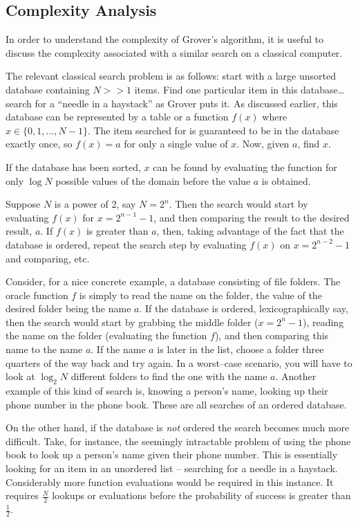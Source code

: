 \subsection{Complexity Analysis}

In order to understand the complexity of Grover's algorithm,
it is useful to discuss the complexity associated with a 
similar search on a classical computer.

The relevant classical search problem is as follows:  
start with a large unsorted database containing $N>>1$ items.
Find one particular item in this database\dots
search for a ``needle in a haystack'' as Grover puts
it\cite{Grover:96a}.  As discussed earlier, this database can 
be represented by a table or a function $f(x)$ where
$x\in\lbrace 0,1,\ldots,N-1\rbrace$.
The item searched for is guaranteed to be in the database
exactly once, so $f(x)=a$ for only a single 
value of $x$. Now, given $a$, find $x$.

If the database has been sorted, $x$ can be found by 
evaluating the function for only $\log N$ possible 
values of the domain before the value $a$ is obtained.

Suppose $N$ is a power of 2, say $N=2^n$.  Then the search
would start by evaluating $f(x)$ for $x=2^{n-1}-1$,
and then comparing the result to the desired result, $a$.
If $f(x)$ is greater than $a$, then, taking advantage of the
fact that the database is ordered, repeat the search
step by evaluating $f(x)$ on $x=2^{n-2}-1$ and comparing,
etc.  

Consider, for a nice concrete example, a database consisting
of file folders.  The oracle function $f$ is simply to read
the name on the folder, the value of the desired folder being
the name $a$.  If the database is ordered, lexicographically say,
then the search would start by grabbing the middle folder
($x=2^n-1$), reading the name on the folder (evaluating the
function $f$), and then comparing this name to the name $a$.
If the name $a$ is later in the list, choose a folder three
quarters of the way back and try again.  In a worst--case
scenario, you will have to look at $\log_2 N$ different 
folders to find the one with the name $a$.  
Another example of this kind of search
is, knowing a person's name, looking up their phone number in
the phone book.  These are all searches of an ordered database.

On the other hand, if the database is {\sl not} ordered the search
becomes much more difficult.  Take, for instance, the seemingly
intractable problem of using the phone book to look up a 
person's name given their phone number.  This is essentially
looking for an item in an unordered list -- searching for a 
needle in a haystack.  Considerably more function evaluations
would be required in this instance.  It requires $\frac{N}{2}$
lookups or evaluations before the probability of success is 
greater than $\frac{1}{2}$.

